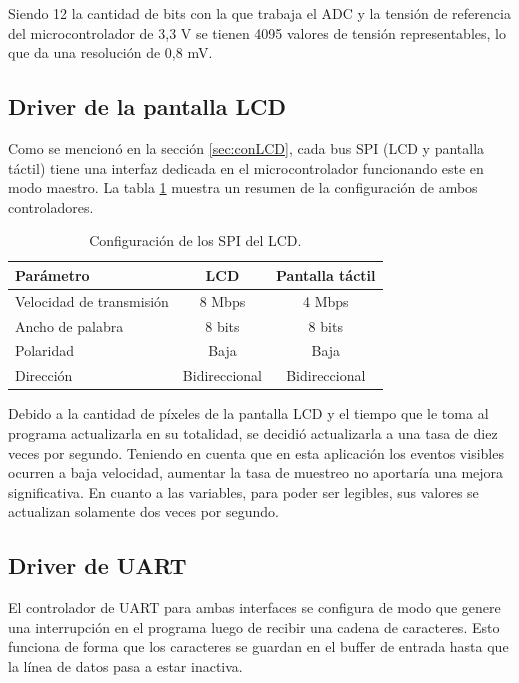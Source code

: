 Siendo 12 la cantidad de bits con la que trabaja el ADC y la tensión de referencia del microcontrolador de 3,3 V se tienen 4095 valores de tensión representables, lo que da una resolución de 0,8 mV.

\subsection{Driver de la pantalla LCD}

Como se mencionó en la sección \ref{sec:conLCD}, cada bus SPI (LCD y pantalla táctil) tiene una interfaz dedicada en el microcontrolador funcionando este en modo maestro. La tabla \ref{tab:configSPI} muestra un resumen de la configuración de ambos controladores.

\begin{table}[H]
	\centering
	\caption{Configuración de los SPI del LCD.}
	\begin{tabular}{l c c}
		\toprule
		\textbf{Parámetro} & \textbf{LCD} & \textbf{Pantalla táctil} \\
		\midrule
		Velocidad de transmisión	& 8 Mbps & 4 Mbps	\\
		Ancho de palabra 				& 8 bits & 8 bits	    \\
		Polaridad							& Baja & Baja \\
		Dirección							& Bidireccional & Bidireccional \\
		\bottomrule
		\hline
	\end{tabular}
	\label{tab:configSPI}
\end{table}

Debido a la cantidad de píxeles de la pantalla LCD y el tiempo que le toma al programa actualizarla en su totalidad, se decidió actualizarla a una tasa de diez veces por segundo. Teniendo en cuenta que en esta aplicación los eventos visibles ocurren a baja velocidad, aumentar la tasa de muestreo no aportaría una mejora significativa. En cuanto a las variables, para poder ser legibles, sus valores se actualizan solamente dos veces por segundo.

\subsection{Driver de UART}

El controlador de UART para ambas interfaces se configura de modo que genere una interrupción en el programa luego de recibir una cadena de caracteres. Esto funciona de forma que los caracteres se guardan en el buffer de entrada hasta que la línea de datos pasa a estar inactiva.

